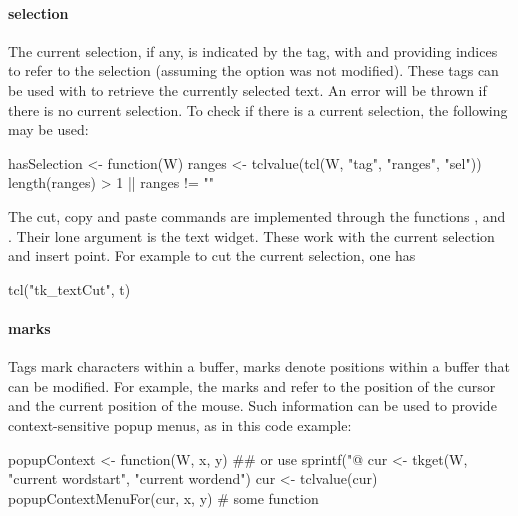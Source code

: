 \paragraph{selection}
The current selection, if any, is indicated by the  tag,
with  and  providing indices to refer
to the selection (assuming the option  was not
modified). These tags can be used with  to retrieve the
currently selected text. An error will be thrown if there is no
current selection. To check if there is a current selection, the following may be used:
\begin{Schunk}
\begin{Sinput}
 hasSelection <- function(W) {
   ranges <- tclvalue(tcl(W, "tag", "ranges", "sel"))
   length(ranges) > 1 || ranges != ""
 }
\end{Sinput}
\end{Schunk}

The cut, copy and paste commands are implemented through the \Tk\/ functions
,  and
. Their lone argument is the text widget. These
work with the current selection and insert point. For example to cut
the current selection, one has
\begin{Schunk}
\begin{Sinput}
 tcl("tk_textCut", t)
\end{Sinput}
\end{Schunk}

\paragraph{marks}
Tags mark characters within a buffer, marks denote positions within a
buffer that can be modified. For example, the marks  and
 refer to the position of the cursor and the current
position of the mouse. Such information can be used to provide
context-sensitive popup menus, as in this code example:
\begin{Schunk}
\begin{Sinput}
 popupContext <- function(W, x, y) {
   ## or use sprintf("@%
   cur <- tkget(W, "current wordstart", "current wordend") 
   cur <- tclvalue(cur)
   popupContextMenuFor(cur, x, y)        # some function
 }
\end{Sinput}
\end{Schunk}


